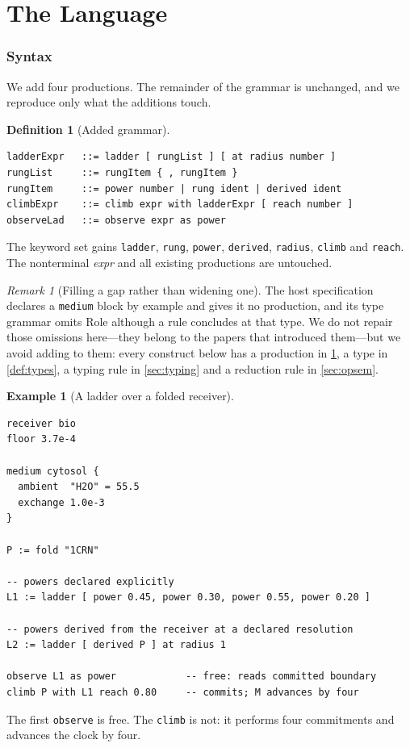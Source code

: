 \documentclass[11pt,twocolumn,a4paper]{article}
\theoremstyle{plain}
\theoremstyle{definition}
\newtheorem{definition}[theorem]{Definition}
\newtheorem{example}[theorem]{Example}
\theoremstyle{remark}
\newtheorem{remark}[theorem]{Remark}
\newcommand{\shk}[1]{\texttt{#1}}
\begin{document}
\part{The Language}
\label{part:language}

\section{Syntax}
\label{sec:syntax}

We add four productions. The remainder of the grammar is unchanged, and we
reproduce only what the additions touch.

\begin{definition}[Added grammar]
\label{def:grammar}
\begin{lstlisting}
ladderExpr   ::= ladder [ rungList ] [ at radius number ]
rungList     ::= rungItem { , rungItem }
rungItem     ::= power number | rung ident | derived ident
climbExpr    ::= climb expr with ladderExpr [ reach number ]
observeLad   ::= observe expr as power
\end{lstlisting}
The keyword set gains \shk{ladder}, \shk{rung}, \shk{power}, \shk{derived},
\shk{radius}, \shk{climb} and \shk{reach}. The nonterminal \textit{expr} and
all existing productions are untouched.
\end{definition}

\begin{remark}[Filling a gap rather than widening one]
\label{rem:gap}
The host specification declares a \shk{medium} block by example and gives it no
production, and its type grammar omits \textsf{Role} although a rule concludes
at that type. We do not repair those omissions here---they belong to the papers
that introduced them---but we avoid adding to them: every construct below has a
production in \cref{def:grammar}, a type in \cref{def:types}, a typing rule in
\cref{sec:typing} and a reduction rule in \cref{sec:opsem}.
\end{remark}

\begin{example}[A ladder over a folded receiver]
\label{ex:program}
\begin{lstlisting}
receiver bio
floor 3.7e-4

medium cytosol {
  ambient  "H2O" = 55.5
  exchange 1.0e-3
}

P := fold "1CRN"

-- powers declared explicitly
L1 := ladder [ power 0.45, power 0.30, power 0.55, power 0.20 ]

-- powers derived from the receiver at a declared resolution
L2 := ladder [ derived P ] at radius 1

observe L1 as power            -- free: reads committed boundary
climb P with L1 reach 0.80     -- commits; M advances by four
\end{lstlisting}
The first \shk{observe} is free. The \shk{climb} is not: it performs four
commitments and advances the clock by four.
\end{example}
\end{document}
